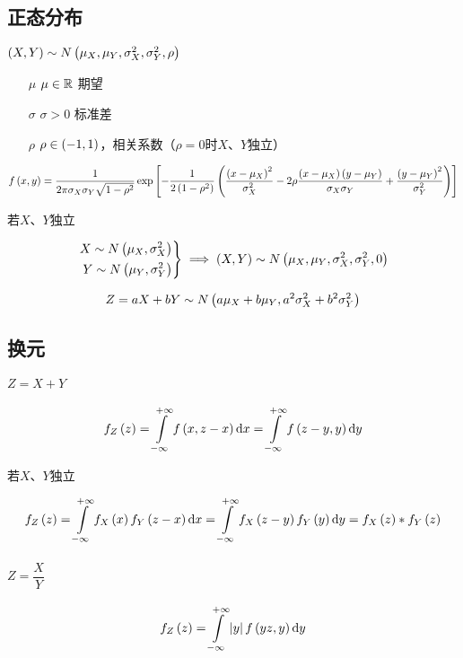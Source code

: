 \documentclass{article}
\begin{document}
\subsection{正态分布}

$\left(X,Y\right)\sim N\left(\mu_X,\mu_Y,\sigma_X^2,\sigma_Y^2,\rho\right)$

\begin{enumerate}
    \item [$\mu$] $\mu\in\mathbb R$ 期望
    \item [$\sigma$] $\sigma>0$ 标准差
    \item [$\rho$] $\rho\in\left(-1,1\right)$，相关系数（$\rho=0$时$X$、$Y$独立）
\end{enumerate}

\[f\left(x,y\right)=\frac1{2\pi\sigma_X\sigma_Y\sqrt{1-\rho^2}}
    \exp\left[-\frac1{2\left(1-\rho^2\right)}
        \left(\frac{{\left(x-\mu_X\right)}^2}{\sigma_X^2}
            -2\rho\frac{\left(x-\mu_X\right)\left(y-\mu_Y\right)}{\sigma_X\sigma_Y}
            +\frac{{\left(y-\mu_Y\right)}^2}{\sigma_Y^2}\right)\right]\]

若$X$、$Y$独立

\[\left.\begin{aligned}
        X\sim N\left(\mu_X,\sigma_X^2\right) \\
        Y\sim N\left(\mu_Y,\sigma_Y^2\right)
    \end{aligned}\right\}\implies
    \left(X,Y\right)\sim N\left(\mu_X,\mu_Y,\sigma_X^2,\sigma_Y^2,0\right)\]


\[Z=aX+bY\sim N\left(a\mu_X+b\mu_Y,a^2\sigma_X^2+b^2\sigma_Y^2\right)\]

\subsection{换元}

\paragraph{$Z=X+Y$}

\[f_Z\left(z\right)
    =\int\limits_{-\infty}^{+\infty} f\left(x,z-x\right)\mathrm d x
    =\int\limits_{-\infty}^{+\infty} f\left(z-y,y\right)\mathrm d y\]

若$X$、$Y$独立

\[f_Z\left(z\right)
    =\int\limits_{-\infty}^{+\infty} f_X\left(x\right)f_Y\left(z-x\right)\mathrm d x
    =\int\limits_{-\infty}^{+\infty} f_X\left(z-y\right)f_Y\left(y\right)\mathrm d y
    =f_X\left(z\right)\ast f_Y\left(z\right)\]

\paragraph{$Z=\dfrac XY$}

\[f_Z\left(z\right)
    =\int\limits_{-\infty}^{+\infty}\left|y\right|f\left(yz,y\right)\mathrm d y\]
\end{document}
